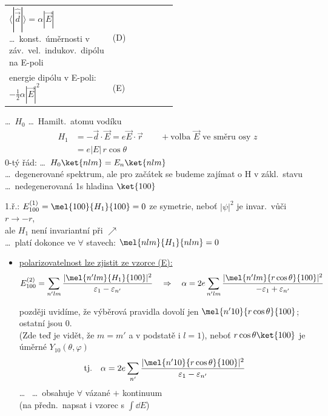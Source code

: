 \begin{definice}
\begin{tabular}{@{}p{0.55\linewidth}l}
$\langle|\hat{\vec d}|\rangle = \alpha|\vec E|$ \quad \dots\ konst.\ úměrnosti v záv.\ vel.\ indukov.\ dipólu na E-poli & (D) \\[4pt]
energie dipólu v E-poli: \quad $-\frac12\alpha|\vec E|^2$ & (E)
\end{tabular}
\end{definice}

\begin{priklad}
\dots\ $H_0$ \dots\ Hamilt.\ atomu vodíku
\begin{align*}
  H_1 &= -\vec d\cdot\vec E = e\vec E\cdot\vec r \qquad + \text{volba } \vec E \text{ ve směru osy } z \\
  &= e|E|\,r\cos\theta
\end{align*}
0-tý řád: \dots\ $H_0\ket{nlm} = E_n\ket{nlm}$ \\
\quad \dots\ degenerované spektrum, ale pro začátek se budeme zajímat o H v zákl.\ stavu \dots\ nedegenerovaná 1s hladina $\ket{100}$

1.ř.: \quad $E_{100}^{(1)} = \mel{100}{H_1}{100} = 0$ \quad ze symetrie, neboť $|\psi|^2$ je invar.\ vůči $r\to -r$, \\
\hspace*{5.5cm} ale $H_1$ není invariantní při $\nearrow$ \\
\quad \dots\ platí dokonce ve $\forall$ stavech: \quad $\mel{nlm}{H_1}{nlm} = 0$

\begin{itemize}
  \item \underline{polarizovatelnost lze zjistit ze vzorce (E):}
  \[
    E_{100}^{(2)} = \sum_{n'lm}\frac{|\mel{n'lm}{H_1}{100}|^2}{\varepsilon_1 - \varepsilon_{n'}}
    \quad\Rightarrow\quad
    \alpha = 2e\sum_{n'lm}\frac{|\mel{n'lm}{r\cos\theta}{100}|^2}{-\varepsilon_1 + \varepsilon_{n'}}
  \]

  později uvidíme, že výběrová pravidla dovolí jen $\mel{n'10}{r\cos\theta}{100}$; ostatní jsou 0. \\
  (Zde teď je vidět, že $m = m'$ a v podstatě i $l = 1$), neboť $r\cos\theta\ket{100}$ je úměrné $Y_{10}(\theta,\varphi)$
  \[
    \text{tj.}\quad \alpha = 2e\sum_{n'}\frac{|\mel{n'10}{r\cos\theta}{100}|^2}{\varepsilon_1 - \varepsilon_{n'}}
  \]
  \dots\  \dots\ obsahuje $\forall$ vázané $+$ kontinuum \\
  \quad (na předn.\ napsat i vzorec s $\int\dd E$)


\end{itemize}
\end{priklad}
